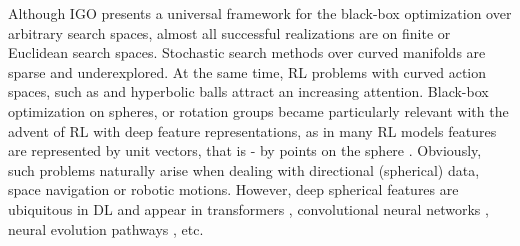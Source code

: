 \documentclass{article}
\theoremstyle{plain}%
\theoremstyle{definition}
\theoremstyle{remark}
\theoremstyle{prop}
\begin{document}
 











Although IGO presents a universal framework for the black-box optimization over arbitrary search spaces, almost all successful realizations are on finite or Euclidean search spaces. Stochastic search methods over curved manifolds are sparse and underexplored. At the same time, RL problems with curved action spaces, such as \cite{JA} and hyperbolic balls \cite{CCBH} attract an increasing attention. Black-box optimization on spheres, or rotation groups \cite{CJK} became particularly relevant with the advent of RL with deep feature representations, as in many RL models features are represented by unit vectors, that is - by points on the sphere \cite{CJK}. Obviously, such problems naturally arise when dealing with directional (spherical) data, space navigation or robotic motions. However, deep spherical features are ubiquitous in DL and appear in transformers \cite{Meng}, convolutional neural networks \cite{CCG}, neural evolution pathways \cite{SNHB}, etc.  
\end{document}
